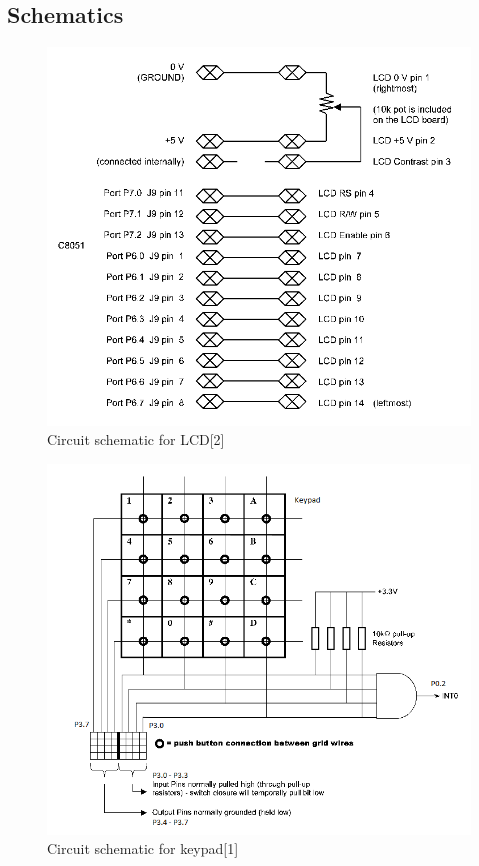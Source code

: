 \documentclass[12pt]{article}
\begin{document}
\subsection{Schematics}
\begin{figure}[H]
	\centering
	\includegraphics[width=\textwidth]{lcd_schematic.PNG}
	\caption[]{Circuit schematic for LCD[2]}
	\label{LCD}
\end{figure}
\begin{figure}[H]
	\centering
	\includegraphics[width=\textwidth]{keypad_schematic.png}
	\caption[]{Circuit schematic for keypad[1]}
	\label{KEY}
\end{figure}
\end{document}
